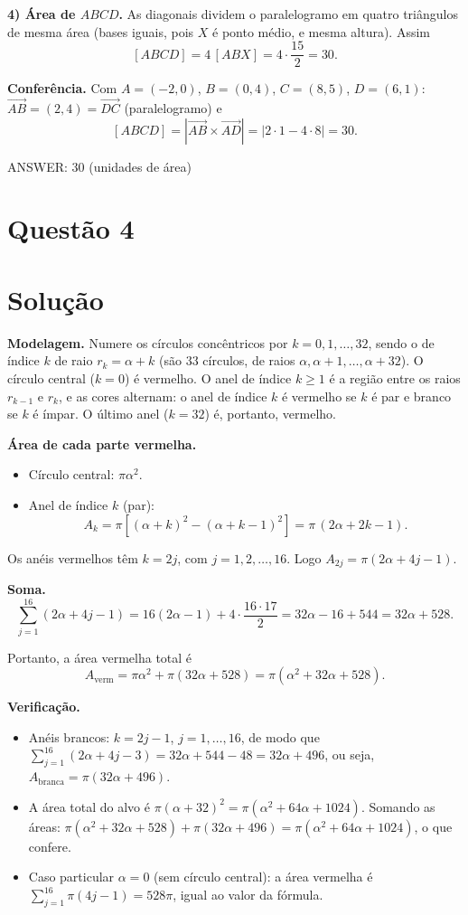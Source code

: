 \documentclass{article}%
\begin{document}
\textbf{4) Área de $ABCD$.} As diagonais dividem o paralelogramo em quatro triângulos de mesma área (bases iguais, pois $X$ é ponto médio, e mesma altura). Assim
\[
[ABCD]=4\,[ABX]=4\cdot\frac{15}{2}=30 .
\]

\textbf{Conferência.} Com $A=(-2,0)$, $B=(0,4)$, $C=(8,5)$, $D=(6,1)$: $\overrightarrow{AB}=(2,4)=\overrightarrow{DC}$ (paralelogramo) e
\[
[ABCD]=\left|\overrightarrow{AB}\times\overrightarrow{AD}\right|=\left|2\cdot1-4\cdot8\right|=30 .
\]

ANSWER: $30$ (unidades de área)%
\newpage%
\section*{Questão 4}

\section*{Solução}

\textbf{Modelagem.} Numere os círculos concêntricos por $k=0,1,\ldots,32$, sendo o de índice $k$ de raio $r_k=\alpha+k$ (são $33$ círculos, de raios $\alpha,\alpha+1,\ldots,\alpha+32$). O círculo central ($k=0$) é vermelho. O anel de índice $k\ge 1$ é a região entre os raios $r_{k-1}$ e $r_k$, e as cores alternam: o anel de índice $k$ é vermelho se $k$ é par e branco se $k$ é ímpar. O último anel ($k=32$) é, portanto, vermelho.

\medskip
\textbf{Área de cada parte vermelha.}
\begin{itemize}
\item Círculo central: $\pi\alpha^2$.
\item Anel de índice $k$ (par):
\[
A_k=\pi\left[(\alpha+k)^2-(\alpha+k-1)^2\right]=\pi\,(2\alpha+2k-1).
\]
\end{itemize}

Os anéis vermelhos têm $k=2j$, com $j=1,2,\ldots,16$. Logo $A_{2j}=\pi(2\alpha+4j-1)$.

\medskip
\textbf{Soma.}
\[
\sum_{j=1}^{16}(2\alpha+4j-1)=16(2\alpha-1)+4\cdot\frac{16\cdot 17}{2}=32\alpha-16+544=32\alpha+528 .
\]

Portanto, a área vermelha total é
\[
A_{\text{verm}}=\pi\alpha^2+\pi(32\alpha+528)=\pi\left(\alpha^2+32\alpha+528\right).
\]

\medskip
\textbf{Verificação.}
\begin{itemize}
\item Anéis brancos: $k=2j-1$, $j=1,\ldots,16$, de modo que
$\sum_{j=1}^{16}(2\alpha+4j-3)=32\alpha+544-48=32\alpha+496$, ou seja, $A_{\text{branca}}=\pi(32\alpha+496)$.
\item A área total do alvo é $\pi(\alpha+32)^2=\pi(\alpha^2+64\alpha+1024)$. Somando as áreas:
$\pi(\alpha^2+32\alpha+528)+\pi(32\alpha+496)=\pi(\alpha^2+64\alpha+1024)$, o que confere.
\item Caso particular $\alpha=0$ (sem círculo central): a área vermelha é $\sum_{j=1}^{16}\pi(4j-1)=528\pi$, igual ao valor da fórmula.
\end{itemize}
\end{document}
